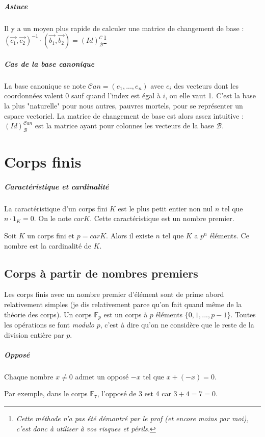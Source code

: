 \documentclass[10pt,a4paper]{book}
\newcommand{\F}{\mathbb{F}}
\begin{document}
\paragraph{Astuce}
Il y a un moyen plus rapide de calculer une matrice de changement de base : $(\vec{c_1},\vec{c_2})^{-1}\cdot (\vec{b_1},\vec{b_2}) = (Id)^{\mathcal{C}}_{\mathcal{B}}$\footnote{\textit{Cette méthode n'a pas été démontré par le prof (et encore moins par moi), c'est donc à utiliser à vos risques et périls.}}

\paragraph{Cas de la base canonique}
La base canonique se note $\mathcal{C}an = (e_1,...,e_n)$ avec $e_i$ des vecteurs dont les coordonnées valent 0 sauf quand l'index est égal à $i$, ou elle vaut 1. C'est la base la plus "naturelle" pour nous autres, pauvres mortels, pour se représenter un espace vectoriel. La matrice de changement de base est alors assez intuitive : $(Id)^{\mathcal{C}an}_{\mathcal{B}}$ est la matrice ayant pour colonnes les vecteurs de la base $\mathcal{B}$.

\chapter{Corps finis}
\paragraph{Caractéristique et cardinalité}
La caractéristique d'un corps fini $K$ est le plus petit entier non nul $n$ tel que $n\cdot 1_K = 0$. On le note $carK$. Cette caractéristique est un nombre premier.\par 
Soit $K$ un corps fini et $p=carK$. Alors il existe $n$ tel que $K$ a $p^n$ éléments. Ce nombre est la cardinalité de $K$.

\section{Corps à partir de nombres premiers}
Les corps finis avec un nombre premier d'élément sont de prime abord relativement simples (je dis relativement parce qu'on fait quand même de la théorie des corps). Un corps $\F_p$ est un corps à $p$ éléments $\{0,1,...,p-1\}$. Toutes les opérations se font \textit{modulo} $p$, c'est à dire qu'on ne considère que le reste de la division entière par $p$.

\paragraph{Opposé}
Chaque nombre $x\neq 0$ admet un opposé $-x$ tel que $x+(-x)=0$.\par
Par exemple, dans le corps $\F_7$, l'opposé de 3 est 4 car $3+4=7=0$.
\end{document}
